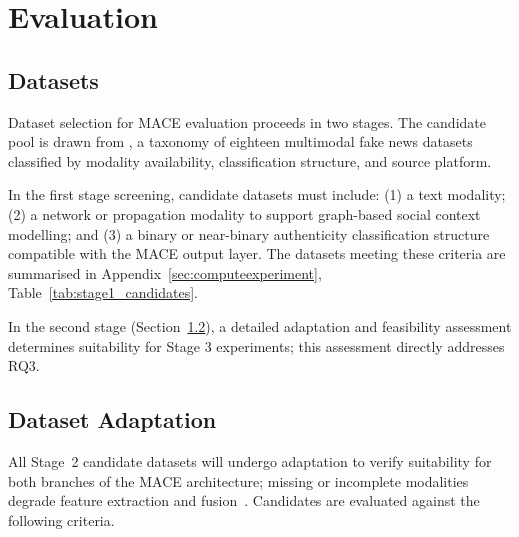 \section{Evaluation}

\subsection{Datasets}
\label{sec:datasets}

Dataset selection for MACE evaluation proceeds in two stages. The candidate pool is drawn from \citet{lv2025multimodal}, a taxonomy of eighteen multimodal fake news datasets classified by modality availability, classification structure, and source platform.

In the first stage screening, candidate datasets must include: (1) a text modality; (2) a network or propagation modality to support graph-based social context modelling; and (3) a binary or near-binary authenticity classification structure compatible with the MACE output layer. The datasets meeting these criteria are summarised in Appendix~\ref{sec:computeexperiment}, Table~\ref{tab:stage1_candidates}.

In the second stage (Section~\ref{sec:dataset_adaptation}), a detailed adaptation and feasibility assessment determines suitability for Stage 3 experiments; this assessment directly addresses RQ3.

\subsection{Dataset Adaptation}
\label{sec:dataset_adaptation}

All Stage~2 candidate datasets will undergo adaptation to verify suitability for both branches of the MACE architecture; missing or incomplete modalities degrade feature extraction and fusion~\citep{Baltrusaitis2019}. Candidates are evaluated against the following criteria.

